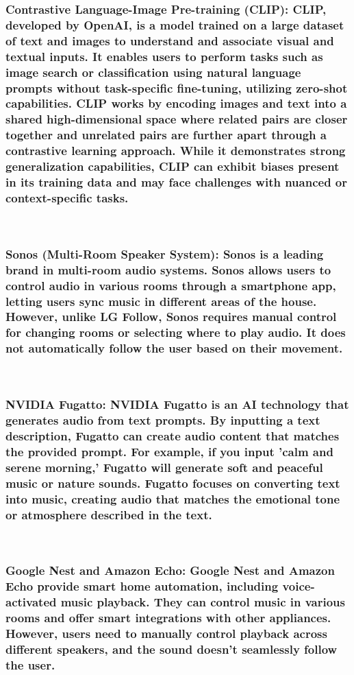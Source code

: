 \documentclass[conference]{IEEEtran}
\begin{document}
\subsubsection{Contrastive Language-Image Pre-training (CLIP): CLIP, developed by OpenAI, is a model trained on a large dataset of text and images to understand and associate visual and textual inputs. It enables users to perform tasks such as image search or classification using natural language prompts without task-specific fine-tuning, utilizing zero-shot capabilities. CLIP works by encoding images and text into a shared high-dimensional space where related pairs are closer together and unrelated pairs are further apart through a contrastive learning approach. While it demonstrates strong generalization capabilities, CLIP can exhibit biases present in its training data and may face challenges with nuanced or context-specific tasks.}

\
\subsubsection{Sonos (Multi-Room Speaker System): Sonos is a leading brand in multi-room audio systems. Sonos allows users to control audio in various rooms through a smartphone app, letting users sync music in different areas of the house. However, unlike LG Follow, Sonos requires manual control for changing rooms or selecting where to play audio. It does not automatically follow the user based on their movement.}

\
\subsubsection{NVIDIA Fugatto: NVIDIA Fugatto is an AI technology that generates audio from text prompts. By inputting a text description, Fugatto can create audio content that matches the provided prompt. For example, if you input 'calm and serene morning,' Fugatto will generate soft and peaceful music or nature sounds. Fugatto focuses on converting text into music, creating audio that matches the emotional tone or atmosphere described in the text.}
\

\subsubsection{Google Nest and Amazon Echo: Google Nest and Amazon Echo provide smart home automation, including voice-activated music playback. They can control music in various rooms and offer smart integrations with other appliances. However, users need to manually control playback across different speakers, and the sound doesn’t seamlessly follow the user. }
\end{document}
